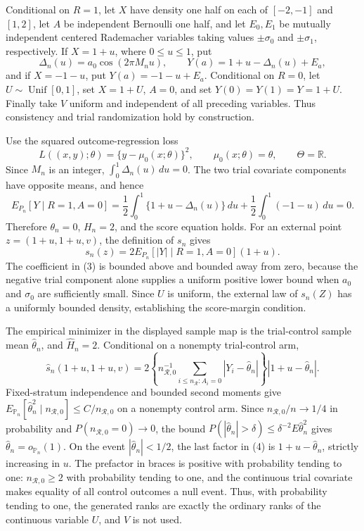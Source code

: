 Conditional on \(R=1\), let \(X\) have density one half on each of \([-2,-1]\) and \([1,2]\), let \(A\) be independent Bernoulli one half, and let \(E_0,E_1\) be mutually independent centered Rademacher variables taking values \(\pm\sigma_0\) and \(\pm\sigma_1\), respectively.  If \(X=1+u\), where \(0\leq u\leq1\), put
\[
 \Delta_n(u)=a_0\cos(2\pi M_nu),
 \qquad
 Y(a)=1+u-\Delta_n(u)+E_a,
\tag{1}
\]
and if \(X=-1-u\), put \(Y(a)=-1-u+E_a\).  Conditional on \(R=0\), let \(U\sim\operatorname{Unif}[0,1]\), set \(X=1+U\), \(A=0\), and set \(Y(0)=Y(1)=Y=1+U\).  Finally take \(V\) uniform and independent of all preceding variables.  Thus consistency and trial randomization hold by construction.

Use the squared outcome-regression loss
\[
 L((x,y);\theta)=\{y-\mu_0(x;\theta)\}^2,
 \qquad \mu_0(x;\theta)=\theta,
 \qquad \Theta=\mathbb R.
\tag{2}
\]
Since \(M_n\) is an integer, \(\int_0^1\Delta_n(u)\,du=0\).  The two trial covariate components have opposite means, and hence
\[
 E_{P_n}[Y\mid R=1,A=0]
 =\frac12\int_0^1\{1+u-\Delta_n(u)\}\,du
  +\frac12\int_0^1(-1-u)\,du=0.
\]
Therefore \(\theta_n=0\), \(H_n=2\), and the score equation holds.  For an external point \(z=(1+u,1+u,v)\), the definition of \(s_n\) gives
\[
 s_n(z)=2E_{P_n}[|Y|\mid R=1,A=0](1+u).
\tag{3}
\]
The coefficient in (3) is bounded above and bounded away from zero, because the negative trial component alone supplies a uniform positive lower bound when \(a_0\) and \(\sigma_0\) are sufficiently small.  Since \(U\) is uniform, the external law of \(s_n(Z)\) has a uniformly bounded density, establishing the score-margin condition.

The empirical minimizer in the displayed sample map is the trial-control sample mean \(\widehat\theta_n\), and \(\widehat H_n=2\).  Conditional on a nonempty trial-control arm,
\[
 \widehat s_n(1+u,1+u,v)
 =2\left\{n_{\mathcal R,0}^{-1}
   \sum_{i\leq n_{\mathcal R}:A_i=0}|Y_i-\widehat\theta_n|\right\}
   |1+u-\widehat\theta_n|.
\tag{4}
\]
Fixed-stratum independence and bounded second moments give \(E_{\mathbb P_n}[\widehat\theta_n^2\mid n_{\mathcal R,0}]\leq C/n_{\mathcal R,0}\) on a nonempty control arm.  Since \(n_{\mathcal R,0}/n\to1/4\) in probability and \(P(n_{\mathcal R,0}=0)\to0\), the bound \(P(|\widehat\theta_n|>\delta)\leq\delta^{-2}E\widehat\theta_n^2\) gives \(\widehat\theta_n=o_{\mathbb P_n}(1)\).  On the event \(|\widehat\theta_n|<1/2\), the last factor in (4) is \(1+u-\widehat\theta_n\), strictly increasing in \(u\).  The prefactor in braces is positive with probability tending to one: \(n_{\mathcal R,0}\geq2\) with probability tending to one, and the continuous trial covariate makes equality of all control outcomes a null event.  Thus, with probability tending to one, the generated ranks are exactly the ordinary ranks of the continuous variable \(U\), and \(V\) is not used.

